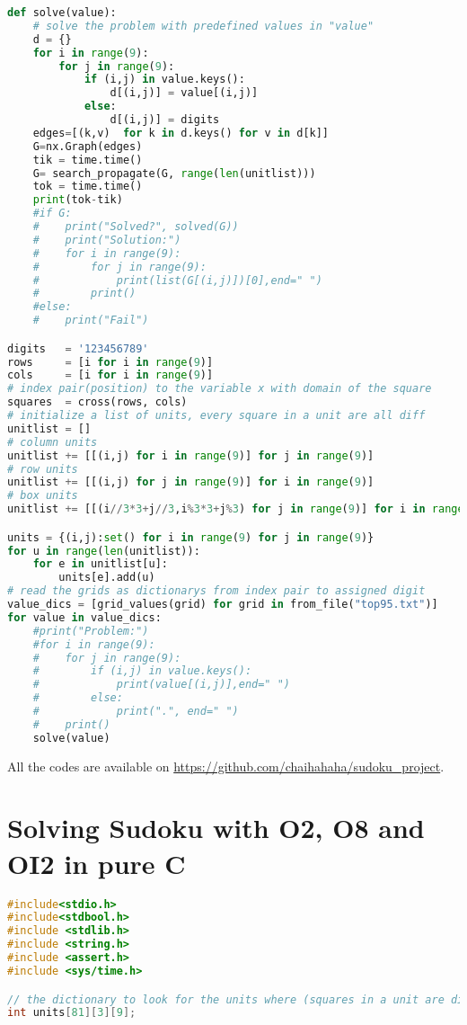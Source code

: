 \documentclass[a4paper, 12pt]{report}
\begin{document}
\begin{appendices}
\begin{lstlisting}[frame=single, language=python]
def solve(value):
    # solve the problem with predefined values in "value"
    d = {}
    for i in range(9):
        for j in range(9):
            if (i,j) in value.keys():
                d[(i,j)] = value[(i,j)]
            else:
                d[(i,j)] = digits
    edges=[(k,v)  for k in d.keys() for v in d[k]]
    G=nx.Graph(edges)
    tik = time.time()
    G= search_propagate(G, range(len(unitlist)))
    tok = time.time()
    print(tok-tik)
    #if G:
    #    print("Solved?", solved(G))
    #    print("Solution:")
    #    for i in range(9):
    #        for j in range(9):
    #            print(list(G[(i,j)])[0],end=" ")
    #        print()
    #else:
    #    print("Fail")

digits   = '123456789'
rows     = [i for i in range(9)]
cols     = [i for i in range(9)]
# index pair(position) to the variable x with domain of the square
squares  = cross(rows, cols)
# initialize a list of units, every square in a unit are all diff
unitlist = []
# column units
unitlist += [[(i,j) for i in range(9)] for j in range(9)]
# row units
unitlist += [[(i,j) for j in range(9)] for i in range(9)]
# box units
unitlist += [[(i//3*3+j//3,i%3*3+j%3) for j in range(9)] for i in range(9)]

units = {(i,j):set() for i in range(9) for j in range(9)}
for u in range(len(unitlist)):
    for e in unitlist[u]:
        units[e].add(u)
# read the grids as dictionarys from index pair to assigned digit
value_dics = [grid_values(grid) for grid in from_file("top95.txt")]
for value in value_dics:
    #print("Problem:")
    #for i in range(9):
    #    for j in range(9):
    #        if (i,j) in value.keys():
    #            print(value[(i,j)],end=" ")
    #        else:
    #            print(".", end=" ")
    #    print()
    solve(value)

            \end{lstlisting}
            All the codes are available on \url{https://github.com/chaihahaha/sudoku_project}.

        \chapter{Solving Sudoku with O2, O8 and OI2 in pure C}
            \label{c}
            \begin{lstlisting}[frame=single, language=C]
#include<stdio.h>
#include<stdbool.h>
#include <stdlib.h>
#include <string.h>
#include <assert.h>
#include <sys/time.h>

// the dictionary to look for the units where (squares in a unit are diff) a square is placed
int units[81][3][9];


\end{lstlisting}
\end{appendices}
\end{document}
